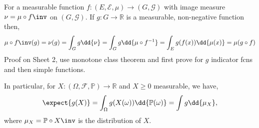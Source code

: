 \begin{example}
	For a measurable function $f \colon (E, \mathcal E, \mu) \to (G, \mathcal G)$ with image measure $\nu = \mu \circ f\inv$ on $(G, \mathcal{G})$.
	If $g \colon G \to \mathbb R$ is a measurable, non-negative function then,
	\begin{align*}
		\mu \circ f\inv(g) = \nu(g) = \int_G g \dd{\nu} = \int_G g \dd{\mu\circ f^{-1}} = \int_E g(f(x)) \dd{\mu(x)} = \mu(g \circ f)
	\end{align*}
	Proof on Sheet 2, use monotone class theorem and first prove for $g$ indicator fcns and then simple functions.

	In particular, for $X : (\Omega, \mathcal{F}, \mathbb{P}) \to \mathbb{R}$ and $X \geq 0$ measurable, we have,
	\[ \expect{g(X)} = \int_\Omega g(X(\omega)) \dd{\mathbb P(\omega)} = \int g \dd{\mu_X}, \]
	where $\mu_X = \mathbb{P} \circ X\inv$ is the distribution of $X$.
\end{example}


